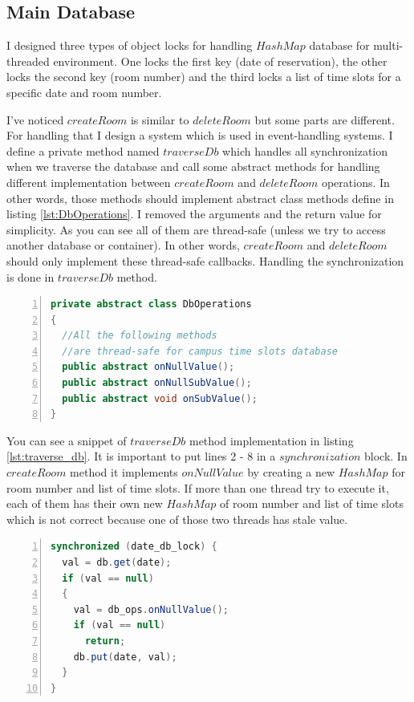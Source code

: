 \documentclass[12pt]{article}
\begin{document}
\subsection{Main Database}
I designed three types of object locks for handling $HashMap$ database for multi-threaded environment. One locks the first key (date of reservation), the other locks the second key (room number) and the third locks a list of time slots for a specific date and room number.
\par I've noticed $createRoom$ is similar to $deleteRoom$ but some parts are different. For handling that I design a system which is used in event-handling systems. I define a private method named $traverseDb$ which handles all synchronization when we traverse the database and call some abstract methods for handling different implementation between $createRoom$ and $deleteRoom$ operations. In other words, those methods should implement abstract class methods define in listing \ref{lst:DbOperations}. I removed the arguments and the return value for simplicity. As you can see all of them are thread-safe (unless we try to access another database or container). In other words, $createRoom$ and $deleteRoom$ should only implement these thread-safe callbacks. Handling the synchronization is done in $traverseDb$ method.

\begin{lstlisting}[language=java,label={lst:DbOperations},caption={DbOperations abstract class},numbers=left]
private abstract class DbOperations
{
  //All the following methods 
  //are thread-safe for campus time slots database
  public abstract onNullValue();
  public abstract onNullSubValue();
  public abstract void onSubValue();
}
\end{lstlisting}

\par You can see a snippet of $traverseDb$ method implementation in listing \ref{lst:traverse_db}. It is important to put lines 2 - 8 in a $synchronization$ block. In $createRoom$ method it implements $onNullValue$ by creating a new $HashMap$ for room number and list of time slots. If more than one thread try to execute it, each of them has their own new $HashMap$ of room number and list of time slots which is not correct because one of those two threads has stale value.

\begin{lstlisting}[language=java,label={lst:traverse_db},caption={Snippet from traverseDb method},numbers=left]
synchronized (date_db_lock) {
  val = db.get(date);
  if (val == null)
  {
    val = db_ops.onNullValue();
    if (val == null)
      return;
    db.put(date, val);
  }
}		
\end{lstlisting}
\end{document}
